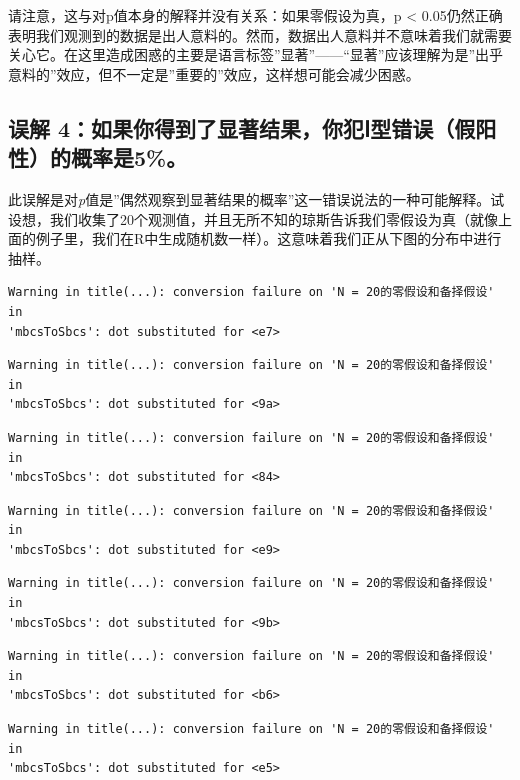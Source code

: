 \documentclass[
  letterpaper,
  DIV=11,
  numbers=noendperiod]{scrreprt}
\begin{document}
请注意，这与对p值本身的解释并没有关系：如果零假设为真，p \textless{}
0.05仍然正确表明我们观测到的数据是出人意料的。然而，数据出人意料并不意味着我们就需要关心它。在这里造成困惑的主要是语言标签''显著''------``显著''应该理解为是''出乎意料的''效应，但不一定是''重要的''效应，这样想可能会减少困惑。

\hypertarget{sec-misconception4}{%
\subsection{误解
4：如果你得到了显著结果，你犯Ⅰ型错误（假阳性）的概率是5\%。}\label{sec-misconception4}}

此误解是对\emph{p}值是''偶然观察到显著结果的概率''这一错误说法的一种可能解释。试设想，我们收集了20个观测值，并且无所不知的琼斯告诉我们零假设为真（就像上面的例子里，我们在R中生成随机数一样）。这意味着我们正从下图的分布中进行抽样。

\begin{verbatim}
Warning in title(...): conversion failure on 'N = 20的零假设和备择假设' in
'mbcsToSbcs': dot substituted for <e7>
\end{verbatim}

\begin{verbatim}
Warning in title(...): conversion failure on 'N = 20的零假设和备择假设' in
'mbcsToSbcs': dot substituted for <9a>
\end{verbatim}

\begin{verbatim}
Warning in title(...): conversion failure on 'N = 20的零假设和备择假设' in
'mbcsToSbcs': dot substituted for <84>
\end{verbatim}

\begin{verbatim}
Warning in title(...): conversion failure on 'N = 20的零假设和备择假设' in
'mbcsToSbcs': dot substituted for <e9>
\end{verbatim}

\begin{verbatim}
Warning in title(...): conversion failure on 'N = 20的零假设和备择假设' in
'mbcsToSbcs': dot substituted for <9b>
\end{verbatim}

\begin{verbatim}
Warning in title(...): conversion failure on 'N = 20的零假设和备择假设' in
'mbcsToSbcs': dot substituted for <b6>
\end{verbatim}

\begin{verbatim}
Warning in title(...): conversion failure on 'N = 20的零假设和备择假设' in
'mbcsToSbcs': dot substituted for <e5>
\end{verbatim}
\end{document}
